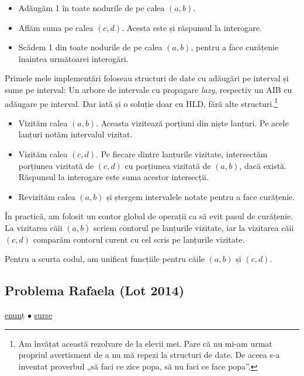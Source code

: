 \documentclass[../main.tex]{subfiles}
\begin{document}
\begin{itemize}
  \item Adăugăm 1 în toate nodurile de pe calea $(a,b)$.

  \item Aflăm suma pe calea $(c,d)$. Acesta este și răspunsul la interogare.

  \item Scădem 1 din toate nodurile de pe calea $(a,b)$, pentru a face curățenie înaintea următoarei interogări.
\end{itemize}

Primele mele implementări foloseau structuri de date cu adăugări pe interval și sume pe interval: Un arbore de intervale cu propagare \textit{lazy}, respectiv un AIB cu adăugare pe interval. Dar iată și o soluție doar cu HLD, fără alte structuri.\footnote{Am învățat această rezolvare de la elevii mei. Pare că nu mi-am urmat propriul avertisment de a nu mă repezi la structuri de date. De aceea s-a inventat proverbul „să faci ce zice popa, să nu faci ce face popa”.}

\begin{itemize}
  \item Vizităm calea $(a,b)$. Aceasta vizitează porțiuni din niște lanțuri. Pe acele lanțuri notăm intervalul vizitat.

  \item Vizităm calea $(c,d)$. Pe fiecare dintre lanțurile vizitate, intersectăm porțiunea vizitată de $(c, d)$ cu porțiunea vizitată de $(a, b)$, dacă există. Răspunsul la interogare este suma acestor intersecții.

  \item Revizităm calea $(a,b)$ și ștergem intervalele notate pentru a face curățenie.
\end{itemize}

În practică, am folosit un contor global de operații ca să evit pasul de curățenie. La vizitarea căii $(a, b)$ scriem contorul pe lanțurile vizitate, iar la vizitarea căii $(c, d)$ comparăm contorul curent cu cel scris pe lanțurile vizitate.

Pentru a scurta codul, am unificat funcțiile pentru căile $(a, b)$ și $(c, d)$.


\subsection{Problema Rafaela (Lot 2014)}
\label{problem:rafaela}

\href{https://kilonova.ro/problems/1979}{enunț}
$\bullet$
\hyperref[code:rafaela]{surse}
\end{document}
